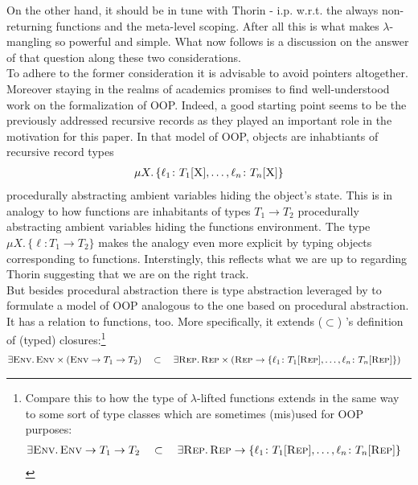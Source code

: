 On the other hand, it should be in tune with Thorin - i.p. w.r.t. the always non-returning functions and the meta-level scoping.
After all this is what makes $\lambda$-mangling so powerful and simple.
What now follows is a discussion on the answer of that question along these two considerations.
\\
To adhere to the former consideration it is advisable to avoid pointers altogether.
Moreover staying in the realms of academics promises to find well-understood work on the formalization of OOP.
Indeed, a good starting point seems to be the previously addressed recursive records as they played an important role in the motivation for this paper.
In that model of OOP, objects are inhabtiants of recursive record types
\begin{align*}
  \mu X
  .\,
  \lbrace
    \ell_{1} \colon T_{1}[\textsc{X}],
    \ldots,
    \ell_{n} \colon T_{n}[\textsc{X}]
  \rbrace
\end{align*}
procedurally abstracting ambient variables hiding the object's state.
This is in analogy to how functions are inhabitants of types $T_{1} \to T_{2}$ procedurally abstracting ambient variables hiding the functions environment.
The type $\mu X.\, \lbrace \ell \colon T_{1} \to T_{2} \rbrace$ makes the analogy even more explicit by typing objects corresponding to functions.
Interstingly, this reflects what we are up to regarding Thorin suggesting that we are on the right track.
\\
But besides procedural abstraction there is type abstraction leveraged by \cite{PierceTurner92} to formulate a model of OOP analogous to the one based on procedural abstraction.
It has a relation to functions, too.
More specifically, it extends ($\subset$) \cite{10.1145/237721.237791}'s definition of (typed) closures:\footnote{
  Compare this to how the type of $\lambda$-lifted functions extends in the same way to some sort of type classes which are sometimes (mis)used for OOP purposes:
\begin{align*}
  \exists
  \textsc{Env}
  .\,
  \textsc{Env} \to T_{1} \to T_{2}
  \quad
  &\subset
  \quad
  \exists
  \textsc{Rep}
  .\,
  \textsc{Rep}
  \to
  \lbrace
    \ell_{1} \colon T_{1}[\textsc{Rep}],
    \ldots,
    \ell_{n} \colon T_{n}[\textsc{Rep}]
  \rbrace
\end{align*}
}
\begin{align*}
  \exists
  \textsc{Env}
  .\,
  \textsc{Env}
  \times
  \left(
    \textsc{Env} \to T_{1} \to T_{2}
  \right)
  \quad
  &\subset
  \quad
  \exists
  \textsc{Rep}
  .\,
  \textsc{Rep}
  \times
  \left(
    \textsc{Rep}
    \to
    \lbrace
      \ell_{1} \colon T_{1}[\textsc{Rep}],
      \ldots,
      \ell_{n} \colon T_{n}[\textsc{Rep}]
    \rbrace
  \right)
\end{align*}
